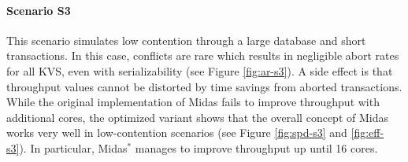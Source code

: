 
\paragraph{Scenario S3}

This scenario simulates low contention through a large database and short
transactions. In this case, conflicts are rare which results in negligible abort
rates for all KVS, even with serializability (see Figure \ref{fig:ar-s3}). A
side effect is that throughput values cannot be distorted by time savings from
aborted transactions. While the original implementation of Midas fails to
improve throughput with additional cores, the optimized variant shows that the
overall concept of Midas works very well in low-contention scenarios (see Figure
\ref{fig:spd-s3} and \ref{fig:eff-s3}). In particular, Midas$^{*}$ manages to
improve throughput up until 16 cores.

